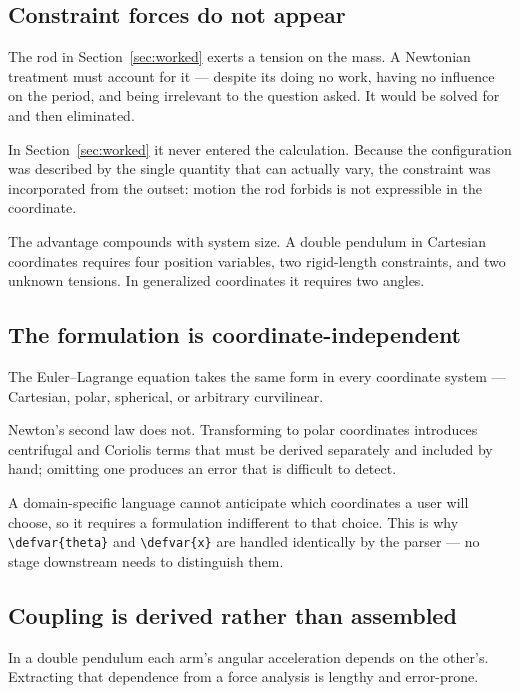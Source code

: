 \documentclass[11pt,a4paper]{article}
\newcommand{\code}[1]{\texttt{#1}}
\begin{document}
\subsection{Constraint forces do not appear}
\label{sec:noconstraintforce}

The rod in Section~\ref{sec:worked} exerts a tension on the mass. A Newtonian treatment must account
for it --- despite its doing no work, having no influence on the period, and being irrelevant to the
question asked. It would be solved for and then eliminated.

In Section~\ref{sec:worked} it never entered the calculation. Because the configuration was
described by the single quantity that can actually vary, the constraint was incorporated from the
outset: motion the rod forbids is not expressible in the coordinate.

The advantage compounds with system size. A double pendulum in Cartesian coordinates requires four
position variables, two rigid-length constraints, and two unknown tensions. In generalized
coordinates it requires two angles.

\subsection{The formulation is coordinate-independent}

The Euler--Lagrange equation takes the same form in every coordinate system --- Cartesian, polar,
spherical, or arbitrary curvilinear.

Newton's second law does not. Transforming to polar coordinates introduces centrifugal and Coriolis
terms that must be derived separately and included by hand; omitting one produces an error that is
difficult to detect.

A domain-specific language cannot anticipate which coordinates a user will choose, so it requires a
formulation indifferent to that choice. This is why \code{\textbackslash defvar\{theta\}} and
\code{\textbackslash defvar\{x\}} are handled identically by the parser --- no stage downstream needs
to distinguish them.

\subsection{Coupling is derived rather than assembled}
\label{sec:coupling}

In a double pendulum each arm's angular acceleration depends on the other's. Extracting that
dependence from a force analysis is lengthy and error-prone.
\end{document}
